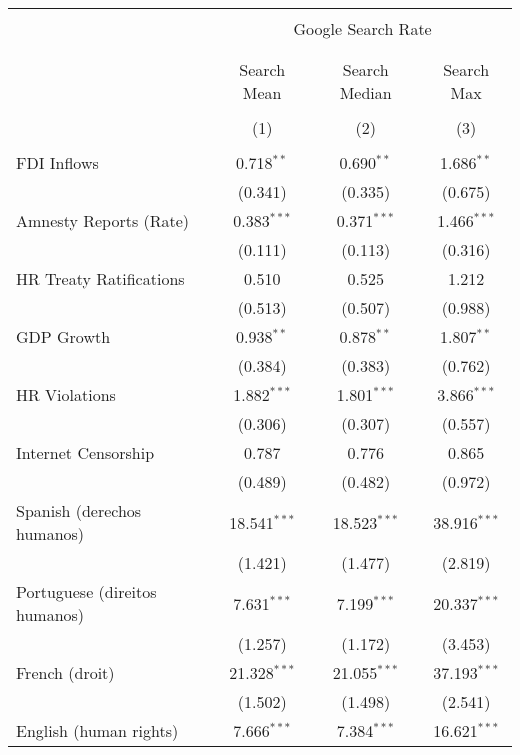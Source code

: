 
\begin{table}[!htbp] \centering 
  \caption{} 
  \label{} 
\begin{tabular}{@{\extracolsep{5pt}}lccc} 
\\[-1.8ex]\hline 
\hline \\[-1.8ex] 
 & \multicolumn{3}{c}{Google Search Rate} \\ 
\cline{2-4} 
\\[-1.8ex] & \multicolumn{3}{c}{ } \\ 
 & Search Mean & Search Median & Search Max \\ 
\\[-1.8ex] & (1) & (2) & (3)\\ 
\hline \\[-1.8ex] 
 FDI Inflows & 0.718$^{**}$ & 0.690$^{**}$ & 1.686$^{**}$ \\ 
  & (0.341) & (0.335) & (0.675) \\ 
  Amnesty Reports (Rate) & 0.383$^{***}$ & 0.371$^{***}$ & 1.466$^{***}$ \\ 
  & (0.111) & (0.113) & (0.316) \\ 
  HR Treaty Ratifications & 0.510 & 0.525 & 1.212 \\ 
  & (0.513) & (0.507) & (0.988) \\ 
  GDP Growth & 0.938$^{**}$ & 0.878$^{**}$ & 1.807$^{**}$ \\ 
  & (0.384) & (0.383) & (0.762) \\ 
  HR Violations & 1.882$^{***}$ & 1.801$^{***}$ & 3.866$^{***}$ \\ 
  & (0.306) & (0.307) & (0.557) \\ 
  Internet Censorship & 0.787 & 0.776 & 0.865 \\ 
  & (0.489) & (0.482) & (0.972) \\ 
  Spanish (derechos humanos) & 18.541$^{***}$ & 18.523$^{***}$ & 38.916$^{***}$ \\ 
  & (1.421) & (1.477) & (2.819) \\ 
  Portuguese (direitos humanos) & 7.631$^{***}$ & 7.199$^{***}$ & 20.337$^{***}$ \\ 
  & (1.257) & (1.172) & (3.453) \\ 
  French (droit) & 21.328$^{***}$ & 21.055$^{***}$ & 37.193$^{***}$ \\ 
  & (1.502) & (1.498) & (2.541) \\ 
  English (human rights) & 7.666$^{***}$ & 7.384$^{***}$ & 16.621$^{***}$ \\ 

\end{tabular}
\end{table}
